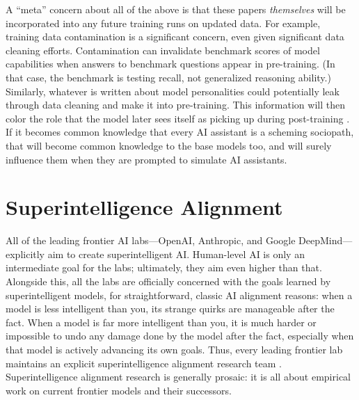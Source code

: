 A ``meta'' concern about all of the above is that these papers
\emph{themselves} will be incorporated into any future training runs on updated
data. For example, training data contamination is a significant concern, even
given significant data cleaning efforts. Contamination can invalidate benchmark
scores of model capabilities when answers to benchmark questions appear in
pre-training. (In that case, the benchmark is testing recall, not generalized
reasoning ability.) Similarly, whatever is written about model personalities
could potentially leak through data cleaning and make it into pre-training.
This information will then color the role that the model later sees itself as
picking up during post-training \cite{nostalgebraist2025void}. If it becomes
common knowledge that every AI assistant is a scheming sociopath, that will
become common knowledge to the base models too, and will surely influence them
when they are prompted to simulate AI assistants.

\section{Superintelligence Alignment}
All of the leading frontier AI labs---OpenAI, Anthropic, and Google
DeepMind---explicitly aim to create superintelligent AI. Human-level AI is only
an intermediate goal for the labs; ultimately, they aim even higher than that.
Alongside this, all the labs are officially concerned with the goals learned by
superintelligent models, for straightforward, classic AI alignment reasons:
when a model is less intelligent than you, its strange quirks are manageable
after the fact. When a model is far more intelligent than you, it is much
harder or impossible to undo any damage done by the model after the fact,
especially when that model is actively advancing its own goals. Thus, every
leading frontier lab maintains an explicit superintelligence alignment research
team \cite{leike2023superalignment,anthropic2025rsp}. Superintelligence
alignment research is generally prosaic: it is all about empirical work on
current frontier models and their successors.

